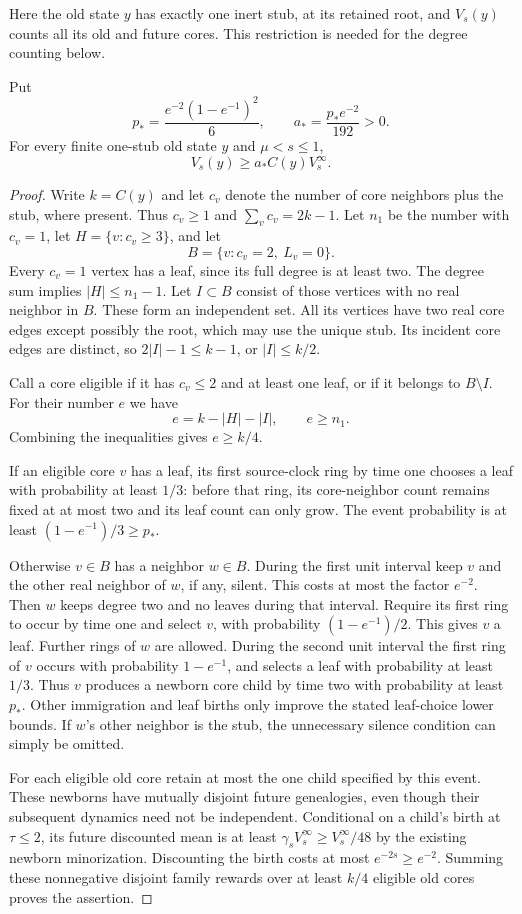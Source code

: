 Here the old state $y$ has exactly one inert stub, at its retained
root, and $V_s(y)$ counts all its old and future cores.  This restriction
is needed for the degree counting below.

\begin{lemma}
\label{cr:old-core-lower}
Put
\[
 p_* = \frac{e^{-2}(1-e^{-1})^2}{6},
 \qquad a_* = \frac{p_*e^{-2}}{192}>0.
\]
For every finite one-stub old state $y$ and $\mu<s\le1$,
\[
 V_s(y)\ge a_* C(y)V_s^\infty.
\]
\end{lemma}
\begin{proof}
Write $k=C(y)$ and let $c_v$ denote the number of core neighbors plus
the stub, where present.  Thus $c_v\ge1$ and
$\sum_vc_v=2k-1$.  Let $n_1$ be the number with $c_v=1$, let
$H=\{v:c_v\ge3\}$, and let
\[
 B=\{v:c_v=2,\ L_v=0\}.
\]
Every $c_v=1$ vertex has a leaf, since its full degree is at least two.
The degree sum implies $|H|\le n_1-1$.
Let $I\subset B$ consist of those vertices with no real neighbor in
$B$.  These form an independent set.  All its vertices have two real
core edges except possibly the root, which may use the unique stub.
Its incident core edges are distinct, so
$2|I|-1\le k-1$, or $|I|\le k/2$.

Call a core eligible if it has $c_v\le2$ and at least one leaf, or if
it belongs to $B\setminus I$.  For their number $e$ we have
\[
 e=k-|H|-|I|,\qquad e\ge n_1.
\]
Combining the inequalities gives $e\ge k/4$.

If an eligible core $v$ has a leaf, its first source-clock ring by
time one chooses a leaf with probability at least $1/3$: before that
ring, its core-neighbor count remains fixed at at most two and its
leaf count can only grow.  The event probability is at least
$(1-e^{-1})/3\ge p_*$.

Otherwise $v\in B$ has a neighbor $w\in B$.  During the first unit
interval keep $v$ and the other real neighbor of $w$, if any, silent.
This costs at most the factor $e^{-2}$.  Then $w$ keeps degree two and
no leaves during that interval.  Require its first ring to occur by
time one and select $v$, with probability $(1-e^{-1})/2$.  This gives
$v$ a leaf.  Further rings of $w$ are allowed.  During the second unit
interval the first ring of $v$ occurs with probability $1-e^{-1}$,
and selects a leaf with probability at least $1/3$.  Thus $v$ produces
a newborn core child by time two with probability at least $p_*$.
Other immigration and leaf births only improve the stated leaf-choice
lower bounds.  If $w$'s other neighbor is the stub, the unnecessary
silence condition can simply be omitted.

For each eligible old core retain at most the one child specified by
this event.  These newborns have mutually disjoint future genealogies,
even though their subsequent dynamics need not be independent.
Conditional on a child's birth at $\tau\le2$, its future discounted
mean is at least $\gamma_sV_s^\infty\ge V_s^\infty/48$ by the
existing newborn minorization.  Discounting the birth costs at most
$e^{-2s}\ge e^{-2}$.  Summing these nonnegative disjoint family rewards
over at least $k/4$ eligible old cores proves the assertion.
\end{proof}


